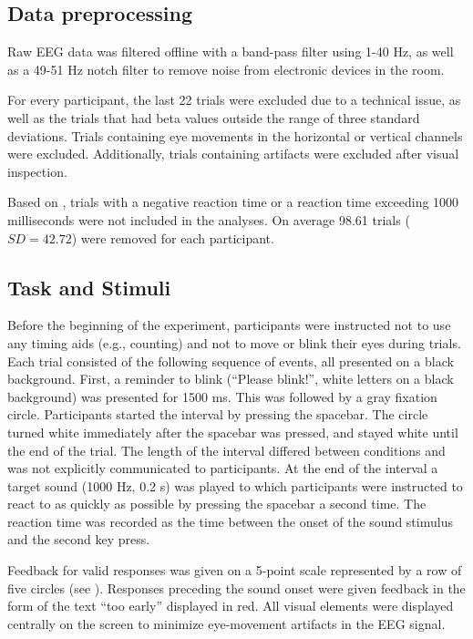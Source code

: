\documentclass[man,floatsintext]{apa6} %
\begin{document}
\subsection{Data preprocessing}
Raw EEG data was filtered offline with a band-pass filter using 1-40
Hz, as well as a 49-51 Hz notch filter to remove noise from electronic
devices in the room.

For every participant, the last 22 trials were excluded due to a
technical issue, as well as the trials that had beta values outside
the range of three standard deviations. Trials containing eye
movements in the horizontal or vertical channels were
excluded. Additionally, trials containing artifacts were excluded after
visual inspection.

Based on , trials with a negative reaction
time or a reaction time exceeding 1000 milliseconds were not included
in the analyses. On average 98.61 trials ($SD = 42.72$) were removed
for each participant.

\subsection{Task and Stimuli}
Before the beginning of the experiment, participants were instructed
not to use any timing aids (e.g., counting) and not to move or blink
their eyes during trials. Each trial consisted of the following
sequence of events, all presented on a black background. First, a
reminder to blink (``Please blink!'', white letters on a black
background) was presented for 1500 ms. This was followed by a gray
fixation circle. Participants started the interval by pressing the
spacebar. The circle turned white immediately after the spacebar was
pressed, and stayed white until the end of the trial. The length of
the interval differed between conditions and was not explicitly
communicated to participants. At the end of the interval a target
sound (1000 Hz, 0.2 s) was played to which participants were
instructed to react to as quickly as possible by pressing the spacebar
a second time. The reaction time was recorded as the time between the
onset of the sound stimulus and the second key press.

Feedback for valid responses was given on a 5-point scale represented
by a row of five circles (see ). Responses preceding
the sound onset were given feedback in the form of the text ``too
early'' displayed in red. All visual elements were displayed centrally
on the screen to minimize eye-movement artifacts in the EEG signal.
\end{document}
